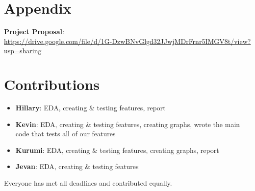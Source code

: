 \documentclass[12pt,letterpaper]{article}
\begin{document}
\section{Appendix}

\begin{center}
\textbf{Project Proposal}: \\
\url{https://drive.google.com/file/d/1G-DzwBNvGlgd32JJwjMDrFrnr5IMGV8t/view?usp=sharing}
\end{center}


\section{Contributions}
\begin{itemize}
    \item \textbf{Hillary}: EDA, creating \& testing features, report
    \item \textbf{Kevin}: EDA, creating \& testing features, creating graphs, wrote the main code that tests all of our features
    \item \textbf{Kurumi}: EDA, creating \& testing features, creating graphs, report
    \item \textbf{Jevan}: EDA, creating \& testing features
\end{itemize}

Everyone has met all deadlines and contributed equally.
\end{document}
